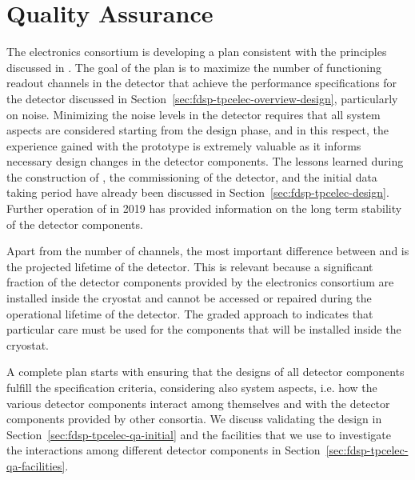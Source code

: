 \section{Quality Assurance}
\label{sec:fdsp-tpcelec-qa}

The  electronics consortium is developing a  plan consistent
with the principles discussed in \tcchqa.
The goal of the  plan is to maximize the number of functioning
readout channels in the detector that achieve the performance specifications
for the detector discussed in Section~\ref{sec:fdsp-tpcelec-overview-design},
particularly on noise. Minimizing the noise levels in the detector requires that all
system aspects are considered starting from the design phase, and in this
respect, the experience gained with the  prototype is extremely
valuable as it informs necessary design changes in the detector 
components. The lessons learned during the construction of ,
the commissioning of the detector, and the initial data taking period have
already been discussed in Section~\ref{sec:fdsp-tpcelec-design}. Further
operation of  in 2019 has provided information on the
long term stability of the detector components.

Apart from the number of channels, the most important difference
between  and  is the projected lifetime of the detector. This
is relevant because a significant fraction of the detector components provided 
by the  electronics consortium are installed inside the cryostat and cannot 
be accessed or repaired during the operational lifetime of the detector. The 
graded approach to  indicates that particular care must be used for
the  components that will be installed inside the cryostat.

A complete  plan starts with ensuring that the designs of all
detector components fulfill the specification criteria, considering
also system aspects, i.e. how the various detector components interact
among themselves and with the detector components provided by other 
consortia. We discuss validating the design in 
Section~\ref{sec:fdsp-tpcelec-qa-initial} and the facilities that we use
to investigate the interactions among different detector components
in Section~\ref{sec:fdsp-tpcelec-qa-facilities}. 

